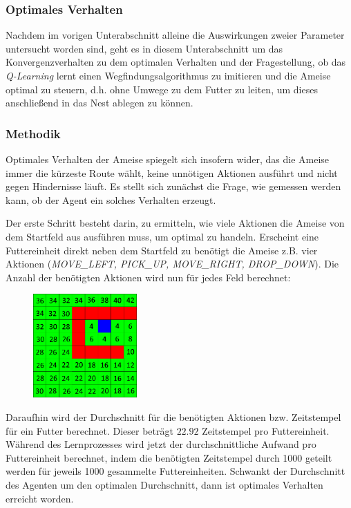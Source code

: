 \subsubsection{Optimales Verhalten}\label{sec:optimalesVerhalten}
Nachdem im vorigen Unterabschnitt alleine die Auswirkungen zweier Parameter untersucht worden sind, geht es in diesem Unterabschnitt um das Konvergenzverhalten zu dem optimalen Verhalten und der Fragestellung, ob das \textit{Q-Learning} lernt einen Wegfindungsalgorithmus zu imitieren und die Ameise optimal zu steuern, d.h. ohne Umwege zu dem Futter zu leiten, um dieses anschließend in das Nest ablegen zu können.

\subsubsection*{Methodik}
Optimales Verhalten der Ameise spiegelt sich insofern wider, das die Ameise immer die kürzeste Route wählt, keine unnötigen Aktionen ausführt und nicht gegen Hindernisse läuft. Es stellt sich zunächst die Frage, wie gemessen werden kann, ob der Agent ein solches Verhalten erzeugt. 
\par 
Der erste Schritt besteht darin, zu ermitteln, wie viele Aktionen die Ameise von dem Startfeld aus ausführen muss, um optimal zu handeln. Erscheint eine Futtereinheit direkt neben dem Startfeld zu benötigt die Ameise z.B. vier Aktionen (\textit{MOVE\_LEFT, PICK\_UP, MOVE\_RIGHT, DROP\_DOWN}). Die Anzahl der benötigten Aktionen wird nun für jedes Feld berechnet:
\begin{figure}[H]
    \centering
    \includegraphics[width=150px]{images/NeededTimestampsFromEverywhere}
    \label{fig:test1}
\end{figure}
Daraufhin wird der Durchschnitt für die benötigten Aktionen bzw. Zeitstempel für ein Futter berechnet. Dieser beträgt $22.92$ Zeitstempel pro Futtereinheit. Während des Lernprozesses wird jetzt der durchschnittliche Aufwand pro Futtereinheit berechnet, indem die benötigten Zeitstempel durch 1000 geteilt werden für jeweils 1000 gesammelte Futtereinheiten. Schwankt der Durchschnitt des Agenten um den optimalen Durchschnitt, dann ist optimales Verhalten erreicht worden.
